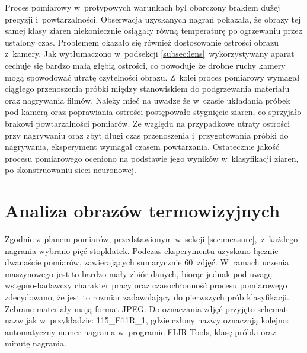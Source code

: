 Proces pomiarowy w~protypowych warunkach był obarczony brakiem dużej precyzji
i~powtarzalności.
Obserwacja uzyskanych nagrań pokazała, że obrazy tej samej klasy ziaren
niekoniecznie osiągały równą temperaturę po ogrzewaniu przez ustalony czas.
Problemem okazało się również dostosowanie ostrości obrazu z~kamery.
Jak wytłumaczono w~podsekcji \ref{subsec:lens}~wykorzystywany aparat cechuje
się bardzo małą głębią ostrości, co powoduje że drobne ruchy kamery mogą
spowodować utratę czytelności obrazu.
Z~kolei proces pomiarowy wymagał ciągłego przenoszenia próbki między
stanowiskiem do podgrzewania materiału oraz nagrywania filmów.
Należy mieć na uwadze że w~czasie układania próbek pod kamerą oraz poprawiania
ostrości postępowało stygnięcie ziaren, co sprzyjało brakowi powtarzalności
pomiarów.
Ze względu na przypadkowe utraty ostrości przy nagrywaniu oraz zbyt długi czas
przenoszenia i~przygotowania próbki do nagrywania, eksperyment wymagał czasem
powtarzania.
Ostatecznie jakość procesu pomiarowego oceniono na podstawie jego wyników
w~klasyfikacji ziaren, po skonstruowaniu sieci neuronowej.

\section{Analiza obrazów termowizyjnych}
Zgodnie z~planem pomiarów, przedstawionym w~sekcji \ref{sec:measure},~z~każdego
nagrania wybrano pięć stopklatek.
Podczas eksperymentu uzyskano łącznie dwanaście pomiarów, zawierających
sumarycznie 60~zdjęć.
W~ramach uczenia maszynowego jest to bardzo mały zbiór danych, biorąc jednak
pod uwagę wstępno-badawczy charakter pracy oraz czasochłonność procesu
pomiarowego zdecydowano, że jest to rozmiar zadawalający do pierwszych prób
klasyfikacji.
Zebrane materiały mają format JPEG.
Do oznaczania zdjęć przyjęto schemat nazw jak w~przykładzie: 115\_E11R\_1, gdzie
człony nazwy oznaczają kolejno: automatyczny numer nagrania w~programie FLIR
Tools, klasę próbki oraz minutę nagrania.

